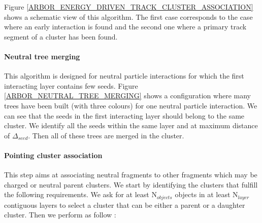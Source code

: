 \documentclass[cits]{JINST}
\begin{document}
Figure \ref{ARBOR_ENERGY_DRIVEN_TRACK_CLUSTER_ASSOCIATION} shows a schematic view of this algorithm. The first case corresponds to the case where an early interaction is found and the second one where a primary track segment of a cluster has been found.

\paragraph*{Neutral tree merging} This algorithm is designed for neutral particle interactions for which the first interacting layer contains few seeds. Figure \ref{ARBOR_NEUTRAL_TREE_MERGING} shows a configuration where many trees have been built (with three colours) for one neutral particle interaction. We can see that the seeds in the first interacting layer should belong to the same cluster. We identify all the seeds within the same layer and at maximum distance of $\Delta_{seed}$. Then all of these trees are merged in the cluster.

\paragraph*{Pointing cluster association} This step aims at associating neutral fragments to other fragments which may be charged or neutral parent clusters. We start by identifying the clusters that fulfill the following requirements. We ask for at least N$_{objects}$ objects in at least N$_{layer}$ contiguous layers to select a cluster that can be either a parent or a daughter cluster. Then we perform as follow :
\end{document}

